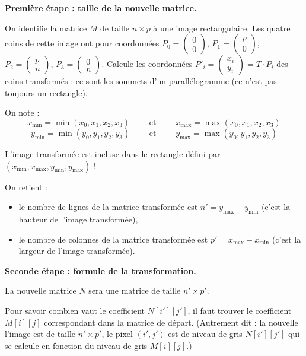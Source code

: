 \documentclass[11pt,class=report,crop=false]{standalone}
\begin{document}
\begin{activite}
\begin{enumerate}
 	\textbf{Première étape : taille de la nouvelle matrice.}
 	
 	On identifie la matrice $M$ de taille $n \times  p$ à une image rectangulaire. Les quatre coins de cette image ont pour coordonnées  $P_0 = \begin{pmatrix}0\\0\end{pmatrix}$,
 	$P_1 = \begin{pmatrix}p\\0\end{pmatrix}$, $P_2=\begin{pmatrix}p\\n\end{pmatrix}$, $P_3=\begin{pmatrix}0\\n\end{pmatrix}$.
 	Calcule les coordonnées $P'_i = \begin{pmatrix}x_i\\y_i\end{pmatrix} = T \cdot P_i$ des coins transformés : ce sont les sommets d'un parallélogramme (ce n'est pas toujours un rectangle).
 	
 	
 	On note :
 	$$x_{\min} = \min(x_0,x_1,x_2,x_3) \qquad \text{ et } \qquad x_{\max} = \max(x_0,x_1,x_2,x_3)$$
 	$$y_{\min} = \min(y_0,y_1,y_2,y_3) \qquad \text{ et } \qquad y_{\max} = \max(y_0,y_1,y_2,y_3)$$
 	
 	L'image transformée est incluse dans le rectangle défini par $(x_{\min},x_{\max},y_{\min},y_{\max})$ !
 
 	
 	On retient :
 	\begin{itemize}
 		\item le nombre de lignes de la matrice transformée est $n' = y_{\max}-y_{\min}$ (c'est la hauteur de l'image transformée), 		
 		\item le nombre de colonnes de la matrice transformée est $p' = x_{\max}-x_{\min}$ (c'est la largeur de l'image transformée).
 	\end{itemize} 
 	
 	\textbf{Seconde étape : formule de la transformation.}
 	
 	La nouvelle matrice $N$ sera une matrice de taille $n'\times p'$. 	
 	
 	Pour savoir combien vaut le coefficient $N[i'][j']$, il faut trouver le coefficient $M[i][j]$ correspondant dans la matrice de départ. 
 	(Autrement dit : la nouvelle l'image est de taille $n'\times p'$, le pixel $(i',j')$ est de niveau de gris $N[i'][j']$ qui se calcule en fonction du niveau de gris $M[i][j]$.) 
 	

\end{enumerate}
\end{activite}
\end{document}
